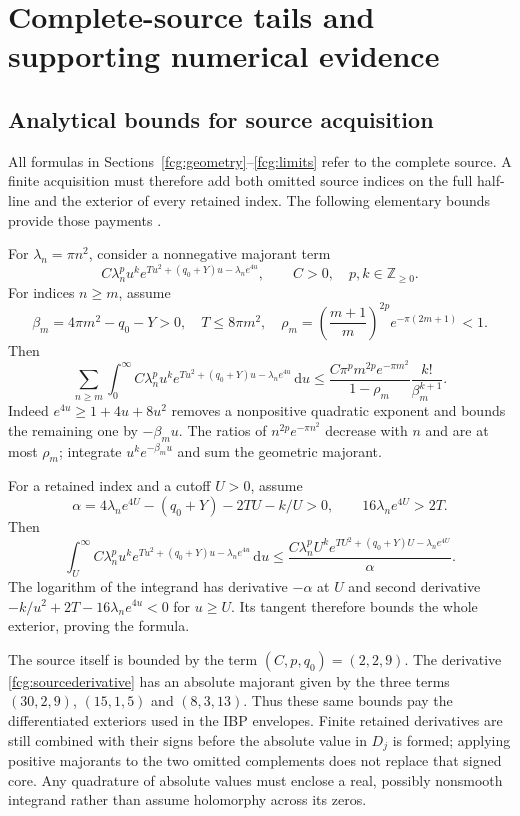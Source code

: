 \documentclass[11pt]{article}
\numberwithin{equation}{section}
\newcommand{\dd}{\,\mathrm d}
\begin{document}
\section{Complete-source tails and supporting numerical evidence}
\label{fcg:supportingevidence}

\subsection{Analytical bounds for source acquisition}

All formulas in Sections~\ref{fcg:geometry}--\ref{fcg:limits} refer to
the complete source. A finite acquisition must therefore add both
omitted source indices on the full half-line and the exterior of every
retained index. The following elementary bounds provide those payments
\cite{FCGQuadratic,FCGAdaptive}.

For $\lambda_n=\pi n^2$, consider a nonnegative majorant term
\[
 C\lambda_n^p u^k
       e^{T u^2+(q_0+Y)u-\lambda_ne^{4u}},
 \qquad C>0,\quad p,k\in\mathbb Z_{\ge0}.
\]
For indices $n\ge m$, assume
\[
 \beta_m=4\pi m^2-q_0-Y>0,\quad
 T\le8\pi m^2,\quad
 \rho_m=\left(\frac{m+1}{m}\right)^{2p}e^{-\pi(2m+1)}<1.
\]
Then
\begin{equation}\label{fcg:modetail}
 \sum_{n\ge m}\int_0^\infty
 C\lambda_n^p u^k e^{T u^2+(q_0+Y)u-\lambda_ne^{4u}}\dd u
 \le
 \frac{C\pi^p m^{2p}e^{-\pi m^2}}{1-\rho_m}
                  \frac{k!}{\beta_m^{k+1}}.
\end{equation}
Indeed $e^{4u}\ge1+4u+8u^2$ removes a nonpositive quadratic
exponent and bounds the remaining one by $-\beta_m u$.
The ratios of $n^{2p}e^{-\pi n^2}$ decrease with $n$ and are at
most $\rho_m$; integrate $u^ke^{-\beta_m u}$ and sum the geometric
majorant.

For a retained index and a cutoff $U>0$, assume
\[
 \alpha=4\lambda_ne^{4U}-(q_0+Y)-2TU-k/U>0,\qquad
 16\lambda_ne^{4U}>2T.
\]
Then
\begin{equation}\label{fcg:spatialtail}
 \int_U^\infty C\lambda_n^p u^k
        e^{T u^2+(q_0+Y)u-\lambda_ne^{4u}}\dd u
 \le\frac{C\lambda_n^p U^k
        e^{TU^2+(q_0+Y)U-\lambda_ne^{4U}}}{\alpha}.
\end{equation}
The logarithm of the integrand has derivative $-\alpha$ at $U$
and second derivative
$-k/u^2+2T-16\lambda_ne^{4u}<0$ for $u\ge U$.
Its tangent therefore bounds the whole exterior, proving the formula.

The source itself is bounded by the term $(C,p,q_0)=(2,2,9)$.
The derivative \eqref{fcg:sourcederivative} has an absolute majorant
given by the three terms $(30,2,9)$, $(15,1,5)$ and $(8,3,13)$.
Thus these same bounds pay the differentiated exteriors used in the
IBP envelopes. Finite retained derivatives are still combined with
their signs before the absolute value in $D_j$ is formed; applying
positive majorants to the two omitted complements does not replace
that signed core. Any quadrature of absolute values must enclose a
real, possibly nonsmooth integrand rather than assume holomorphy
across its zeros.
\end{document}
